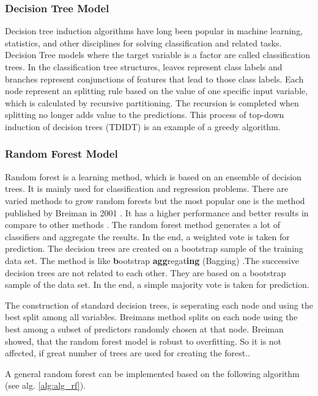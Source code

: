     	\subsubsection{Decision Tree Model}
            \noindent Decision tree induction algorithms have long been popular in machine learning, statistics, and other disciplines for solving classification and related tasks. Decision Tree models where the target variable is a factor are called classification trees. In the classification tree structures, leaves represent class labels and branches represent conjunctions of features that lead to those class labels. Each node represent an splitting rule based on the value of one specific input variable, which is calculated by recursive partitioning. The recursion is completed when splitting no longer adds value to the predictions. This process of top-down induction of decision trees (TDIDT) \citep{quinlan} is an example of a greedy algorithm.
    	\subsubsection{Random Forest Model}
    	Random forest is a learning method, which is based on an ensemble of decision trees. It is mainly used for classification and regression problems. There are varied methods to grow random forests but the most popular one is the method published by Breiman in 2001 \cite{Breiman2001}. It has a higher performance and better results in compare to other methods \cite{4016560}. 
The random forest method generates a lot of classifiers and aggregate the results. In the end, a weighted vote is taken for prediction. The decision trees are created on a bootstrap sample of the training data set. The method is like \textbf{b}ootstrap \textbf{agg}regat\textbf{ing} (Bagging) \cite{Breiman96}.The successive decision trees are not related to each other. They are based on a bootstrap sample of the data set. In the end, a simple
majority vote is taken for prediction.

The construction of standard decision trees, is seperating each node and using the best split among all variables. Breimans method splits on each node using the best among a subset of predictors randomly chosen at that node. Breiman showed, that the random forest model is robust to overfitting. So it is not affected, if great number of trees are used for creating the forest.\cite{Breiman2001}.

A general random forest can be implemented based on the following algorithm (see alg. \ref{alg:alg_rf}).\\

